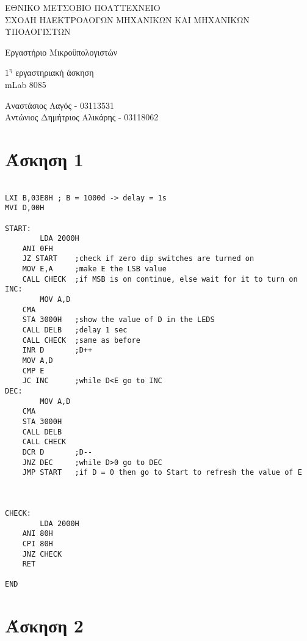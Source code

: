\documentclass[11pt]{article}
\begin{document}
\begin{titlepage}
	\begin{center}
		{ 
			ΕΘΝΙΚΟ ΜΕΤΣΟΒΙΟ ΠΟΛΥΤΕΧΝΕΙΟ\\
			ΣΧΟΛΗ ΗΛΕΚΤΡΟΛΟΓΩΝ ΜΗΧΑΝΙΚΩΝ ΚΑΙ ΜΗΧΑΝΙΚΩΝ ΥΠΟΛΟΓΙΣΤΩΝ
		}
		
		\vfill

		{\Large
			Εργαστήριο Μικροϋπολογιστών
		}
		
		{\large
			$1^η$ εργαστηριακή άσκηση \\ mLab 8085
		}

		\vfill

		{
			Αναστάσιος Λαγός - 03113531\\
			Αντώνιος Δημήτριος Αλικάρης - 03118062
		}
	\end{center}
\end{titlepage}

\section*{Άσκηση 1}

\begin{verbatim}

LXI B,03E8H ; B = 1000d -> delay = 1s
MVI D,00H

START:
        LDA 2000H
	ANI 0FH
	JZ START	;check if zero dip switches are turned on
	MOV E,A	    ;make E the LSB value
	CALL CHECK	;if MSB is on continue, else wait for it to turn on
INC:
        MOV A,D
	CMA
	STA 3000H	;show the value of D in the LEDS
	CALL DELB	;delay 1 sec
	CALL CHECK	;same as before
	INR D		;D++
	MOV A,D
	CMP E
	JC INC		;while D<E go to INC
DEC:
        MOV A,D
	CMA
	STA 3000H
	CALL DELB
	CALL CHECK
	DCR D		;D--
	JNZ DEC 	;while D>0 go to DEC
	JMP START	;if D = 0 then go to Start to refresh the value of E



CHECK:
        LDA 2000H
	ANI 80H
	CPI 80H
	JNZ CHECK
	RET

END	

\end{verbatim}

\section*{Άσκηση 2}
\end{document}
